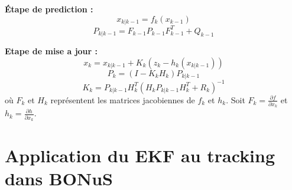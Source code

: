 \documentclass[a4paper,11pt]{StyleThese}
\begin{document}
\textbf{Étape de prediction :} 
\begin{equation}
  x_{k|k-1} = f_k(x_{k-1})
\end{equation}
\begin{equation}
  P_{k|k-1} = F_{k-1}P_{k-1}F^T_{k-1} + Q_{k-1} 
\end{equation}

\textbf{Etape de mise a jour :}
\begin{equation}
  x_{k} = x_{k|k-1} + K_k(z_k - h_k(x_{k|k-1}))
\end{equation}
\begin{equation}
  P_k = (I-K_kH_k)P_{k|k-1}
\end{equation}
\begin{equation}
  K_k = P_{k|k-1}H_k^T(H_kP_{k|k-1}H_k^T + R_k)^{-1}
\end{equation}
où $F_k$ et $H_k$ représentent les matrices jacobiennes de $f_k$ et $h_k$. Soit $F_k = \frac{\partial f}{\partial x_k}$ et $h_k = \frac{\partial h}{\partial x_k}$.
\section{Application du EKF au tracking dans BONuS}
\end{document}
